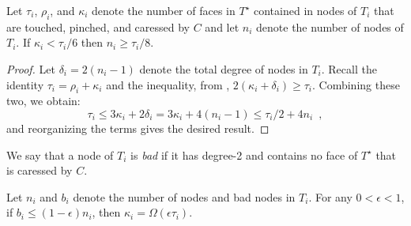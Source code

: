 \documentclass{patmorin}
\newcommand{\dual}[1]{{#1}^\star}
\begin{document}
\begin{lem}
  Let $\tau_i$, $\rho_i$, and $\kappa_i$ denote the number of faces
  in $\dual{T}$ contained in nodes of $T_i$ that are touched, pinched,
  and caressed by $C$ and let $n_i$ denote the number of nodes of $T_i$.
  If $\kappa_i < \tau_i/6$ then $n_i\ge \tau_i/8$.
\end{lem}

\begin{proof}
  Let $\delta_i=2(n_i-1)$ denote the total degree of nodes in $T_i$.
  Recall the identity $\tau_i = \rho_i+\kappa_i$ and the inequality,
  from , $2(\kappa_i+\delta_i)
  \ge \tau_i$. Combining these two, we obtain:
  \[
  \tau_i 
     \le 3\kappa_i + 2\delta_i 
     = 3\kappa_i + 4(n_i-1) 
     \le \tau_i/2 + 4n_i \enspace ,
  \]
  and reorganizing the terms gives the desired result.
\end{proof}

We say that a node of $T_i$ is \emph{bad} if it has degree-2 and contains
no face of $\dual{T}$ that is caressed by $C$.

\begin{lem}
   Let $n_i$ and $b_i$ denote the number of nodes and bad nodes in
   $T_i$. For any $0<\epsilon < 1$, if $b_i \le (1-\epsilon)n_i$, then
   $\kappa_i = \Omega(\epsilon\tau_i)$.
\end{lem}
\end{document}
